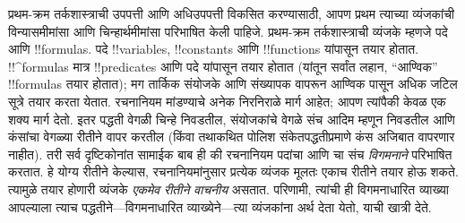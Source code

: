 \documentclass[../../../include/open-logic-section]{subfiles}
\begin{document}


प्रथम-क्रम तर्कशास्त्राची उपपत्ती आणि अधिउपपत्ती विकसित करण्यासाठी,
आपण प्रथम त्याच्या व्यंजकांची विन्यासमीमांसा आणि चिन्हार्थमीमांसा
परिभाषित केली पाहिजे. प्रथम-क्रम तर्कशास्त्राची व्यंजके म्हणजे पदे आणि
!!{formula}s. पदे !!{variable}s, !!{constant}s आणि !!{function}s
यांपासून तयार होतात. !!^{formula}s मात्र !!{predicate}s आणि पदे
यांपासून तयार होतात (यांतून सर्वांत लहान, ``आण्विक'' !!{formula}s
तयार होतात); मग तार्किक संयोजके आणि संख्यापक वापरून आण्विक
पासून अधिक जटिल सूत्रे तयार करता येतात. रचनानियम
मांडण्याचे अनेक निरनिराळे मार्ग आहेत; आपण त्यांपैकी केवळ एक शक्य
मार्ग देतो. इतर पद्धती वेगळी चिन्हे निवडतील, संयोजकांचे वेगळे संच
आदिम म्हणून निवडतील आणि कंसांचा वेगळ्या रीतीने वापर करतील (किंवा
तथाकथित पोलिश संकेतपद्धतीप्रमाणे कंस अजिबात वापरणार नाहीत). तरी सर्व
दृष्टिकोनांत सामाईक बाब ही की रचनानियम पदांचा आणि चा
संच \emph{विगमनाने} परिभाषित करतात. हे योग्य रीतीने केल्यास,
रचनानियमांनुसार प्रत्येक व्यंजक मूलतः एकाच रीतीने तयार होऊ शकते.
त्यामुळे तयार होणारी व्यंजके \emph{एकमेव रीतीने वाचनीय} असतात. परिणामी,
त्यांची ही विगमनाधारित व्याख्या आपल्याला त्याच पद्धतीने---विगमनाधारित
व्याख्येने---त्या व्यंजकांना अर्थ देता येतो, याची खात्री देते.
\end{document}
